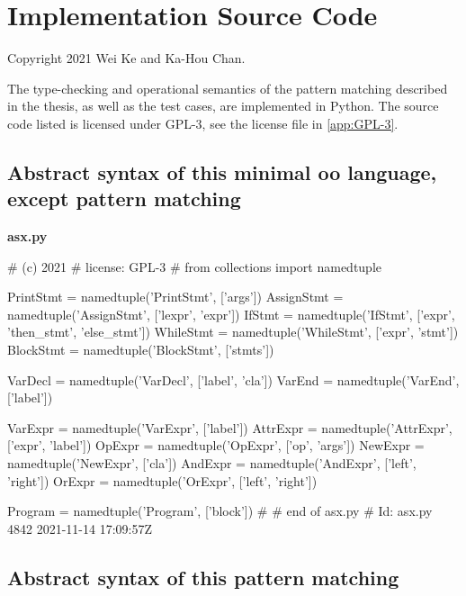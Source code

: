 \chapter{Implementation Source Code}\label{app:source}

\newcommand{\PyFile}[1]{{\raggedleft\color{Crimson}\ttfamily\bfseries\small#1\par}}

\begin{center}
Copyright {\textcopyright} 2021 Wei Ke and Ka-Hou Chan.
\end{center}

The type-checking and operational semantics of the pattern matching described in the thesis, as well as the test cases, are implemented in Python.
The source code listed is licensed under GPL-3, see the license file in \autoref{app:GPL-3}.

\section[Abstract syntax of all else]{Abstract syntax of this minimal oo language, except pattern matching}

\PyFile{asx.py}
\begin{dispPy}
#    (c) 2021 
#    license:          GPL-3
#
from collections import namedtuple

PrintStmt = namedtuple('PrintStmt', ['args'])
AssignStmt = namedtuple('AssignStmt', ['lexpr', 'expr'])
IfStmt = namedtuple('IfStmt', ['expr', 'then_stmt', 'else_stmt'])
WhileStmt = namedtuple('WhileStmt', ['expr', 'stmt'])
BlockStmt = namedtuple('BlockStmt', ['stmts'])

VarDecl = namedtuple('VarDecl', ['label', 'cla'])
VarEnd = namedtuple('VarEnd', ['label'])

VarExpr = namedtuple('VarExpr', ['label'])
AttrExpr = namedtuple('AttrExpr', ['expr', 'label'])
OpExpr = namedtuple('OpExpr', ['op', 'args'])
NewExpr = namedtuple('NewExpr', ['cla'])
AndExpr = namedtuple('AndExpr', ['left', 'right'])
OrExpr = namedtuple('OrExpr', ['left', 'right'])

Program = namedtuple('Program', ['block'])
#
# end of asx.py
# Id: asx.py 4842 2021-11-14 17:09:57Z 
\end{dispPy}

\section[Abstract syntax of pattern matching]{Abstract syntax of this pattern matching}

